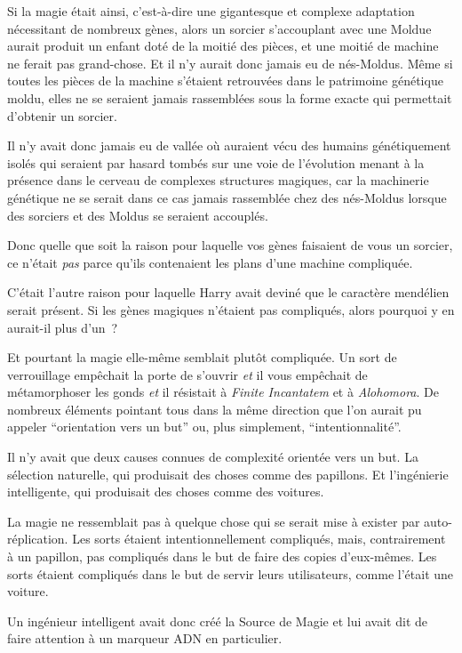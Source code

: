 Si la magie était ainsi, c'est-à-dire une gigantesque et complexe adaptation nécessitant de nombreux gènes, alors un sorcier s'accouplant avec une Moldue aurait produit un enfant doté de la moitié des pièces, et une moitié de machine ne ferait pas grand-chose.
Et il n'y aurait donc jamais eu de nés-Moldus.
Même si toutes les pièces de la machine s'étaient retrouvées dans le patrimoine génétique moldu, elles ne se seraient jamais rassemblées sous la forme exacte qui permettait d'obtenir un sorcier.

Il n'y avait donc jamais eu de vallée où auraient vécu des humains génétiquement isolés qui seraient par hasard tombés sur une voie de l'évolution menant à la présence dans le cerveau de complexes structures magiques, car la machinerie génétique ne se serait dans ce cas jamais rassemblée chez des nés-Moldus lorsque des sorciers et des Moldus se seraient accouplés.

Donc quelle que soit la raison pour laquelle vos gènes faisaient de vous un sorcier, ce n'était \emph{pas} parce qu'ils contenaient les plans d'une machine compliquée.

C'était l'autre raison pour laquelle Harry avait deviné que le caractère mendélien serait présent.
Si les gènes magiques n'étaient pas compliqués, alors pourquoi y en aurait-il plus d'un~?

Et pourtant la magie elle-même semblait plutôt compliquée.
Un sort de verrouillage empêchait la porte de s'ouvrir \emph{et} il vous empêchait de métamorphoser les gonds \emph{et} il résistait à \emph{Finite Incantatem} et à \emph{Alohomora}.
De nombreux éléments pointant tous dans la même direction que l'on aurait pu appeler “orientation vers un but” ou, plus simplement, “intentionnalité”.

Il n'y avait que deux causes connues de complexité orientée vers un but.
La sélection naturelle, qui produisait des choses comme des papillons.
Et l'ingénierie intelligente, qui produisait des choses comme des voitures.

La magie ne ressemblait pas à quelque chose qui se serait mise à exister par auto-réplication.
Les sorts étaient intentionnellement compliqués, mais, contrairement à un papillon, pas compliqués dans le but de faire des copies d'eux-mêmes.
Les sorts étaient compliqués dans le but de servir leurs utilisateurs, comme l'était une voiture.

Un ingénieur intelligent avait donc créé la Source de Magie et lui avait dit de faire attention à un marqueur ADN en particulier.

